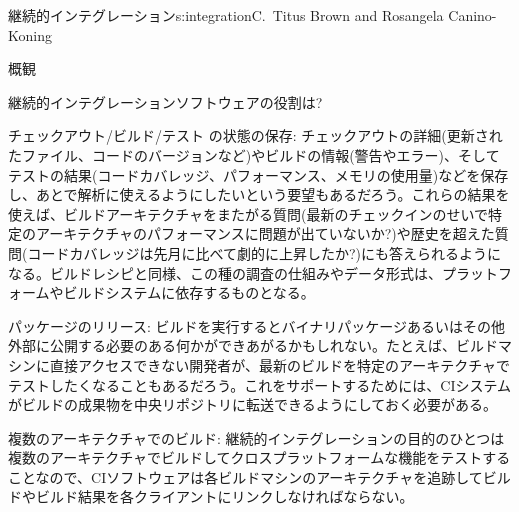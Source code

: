 \begin{aosachapter}{継続的インテグレーション}{s:integration}{C.\ Titus Brown and Rosangela Canino-Koning}
\begin{aosasect1}{概観}
\begin{aosasect2}{継続的インテグレーションソフトウェアの役割は?}
\begin{aosadescription}
  \item{チェックアウト/ビルド/テスト の状態の保存:} チェックアウトの詳細(更新されたファイル、コードのバージョンなど)やビルドの情報(警告やエラー)、そしてテストの結果(コードカバレッジ、パフォーマンス、メモリの使用量)などを保存し、あとで解析に使えるようにしたいという要望もあるだろう。これらの結果を使えば、ビルドアーキテクチャをまたがる質問(最新のチェックインのせいで特定のアーキテクチャのパフォーマンスに問題が出ていないか?)や歴史を超えた質問(コードカバレッジは先月に比べて劇的に上昇したか?)にも答えられるようになる。ビルドレシピと同様、この種の調査の仕組みやデータ形式は、プラットフォームやビルドシステムに依存するものとなる。

  \item{パッケージのリリース:} ビルドを実行するとバイナリパッケージあるいはその他外部に公開する必要のある何かができあがるかもしれない。たとえば、ビルドマシンに直接アクセスできない開発者が、最新のビルドを特定のアーキテクチャでテストしたくなることもあるだろう。これをサポートするためには、CIシステムがビルドの成果物を中央リポジトリに転送できるようにしておく必要がある。
  
  \item{複数のアーキテクチャでのビルド:} 継続的インテグレーションの目的のひとつは複数のアーキテクチャでビルドしてクロスプラットフォームな機能をテストすることなので、CIソフトウェアは各ビルドマシンのアーキテクチャを追跡してビルドやビルド結果を各クライアントにリンクしなければならない。


\end{aosadescription}
\end{aosasect2}
\end{aosasect1}
\end{aosachapter}
